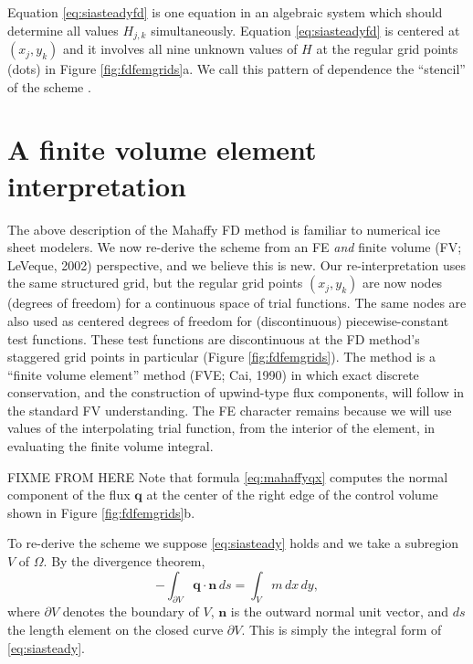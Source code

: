 \documentclass[twocolumn]{igs}
\newcommand\bn{\mathbf{n}}
\newcommand\bq{\mathbf{q}}
\begin{document}
Equation \eqref{eq:siasteadyfd} is one equation in an algebraic system which should determine all values $H_{j,k}$ simultaneously.  Equation \eqref{eq:siasteadyfd} is centered at $(x_j,y_k)$ and it involves all nine unknown values of $H$ at the regular grid points (dots) in Figure \ref{fig:fdfemgrids}a.  We call this pattern of dependence the ``stencil'' of the scheme \citep{MortonMayers2005}.


\section{A finite volume element interpretation} \label{sec:fveinterpretation}

The above description of the Mahaffy FD method is familiar to numerical ice sheet modelers.  We now re-derive the scheme from an FE \emph{and} finite volume (FV; LeVeque, 2002)\nocite{LeVeque} perspective, and we believe this is new.  Our re-interpretation uses the same structured grid, but the regular grid points $(x_j,y_k)$ are now nodes (degrees of freedom) for a continuous space of trial functions.  The same nodes are also used as centered degrees of freedom for (discontinuous) piecewise-constant test functions.  These test functions are discontinuous at the FD method's staggered grid points in particular (Figure \ref{fig:fdfemgrids}).  The method is a ``finite volume element'' method (FVE; Cai, 1990)\nocite{Cai1990} in which exact discrete conservation, and the construction of upwind-type flux components, will follow in the standard FV understanding.  The FE character remains because we will use values of the interpolating trial function, from the interior of the element, in evaluating the finite volume integral.

FIXME FROM HERE Note that formula \eqref{eq:mahaffyqx} computes the normal component of the flux $\bq$ at the center of the right edge of the control volume shown in Figure \ref{fig:fdfemgrids}b.  

To re-derive the scheme we suppose \eqref{eq:siasteady} holds and we take a subregion $V$ of $\Omega$.  By the divergence theorem,
\begin{equation}
  - \int_{\partial V} \bq \cdot \bn\,ds = \int_V m\, dx\,dy, \label{eq:siaasconservation}
\end{equation}
where $\partial V$ denotes the boundary of $V$, $\bn$ is the outward normal unit vector, and $ds$ the length element on the closed curve $\partial V$.  This is simply the integral form of \eqref{eq:siasteady}.
\end{document}
